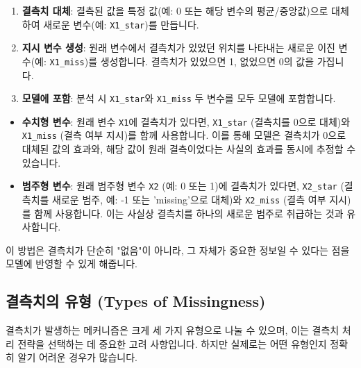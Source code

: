 \documentclass[11pt,a4paper]{book}
\theoremstyle{definition}
\begin{document}
\begin{infobox}[title=결측 지시 변수 생성 절차]
\begin{enumerate}
    \item \textbf{결측치 대체}: 결측된 값을 특정 값(예: 0 또는 해당 변수의 평균/중앙값)으로 대체하여 새로운 변수(예: \texttt{X1\_star})를 만듭니다.
    \item \textbf{지시 변수 생성}: 원래 변수에서 결측치가 있었던 위치를 나타내는 새로운 이진 변수(예: \texttt{X1\_miss})를 생성합니다. 결측치가 있었으면 1, 없었으면 0의 값을 가집니다.
    \item \textbf{모델에 포함}: 분석 시 \texttt{X1\_star}와 \texttt{X1\_miss} 두 변수를 모두 모델에 포함합니다.
\end{enumerate}
\end{infobox}

\begin{examplebox}[title=결측 지시 변수 활용 예시]
\begin{itemize}
    \item \textbf{수치형 변수}: 원래 변수 \texttt{X1}에 결측치가 있다면, \texttt{X1\_star} (결측치를 0으로 대체)와 \texttt{X1\_miss} (결측 여부 지시)를 함께 사용합니다. 이를 통해 모델은 결측치가 0으로 대체된 값의 효과와, 해당 값이 원래 결측이었다는 사실의 효과를 동시에 추정할 수 있습니다.
    \item \textbf{범주형 변수}: 원래 범주형 변수 \texttt{X2} (예: 0 또는 1)에 결측치가 있다면, \texttt{X2\_star} (결측치를 새로운 범주, 예: -1 또는 'missing'으로 대체)와 \texttt{X2\_miss} (결측 여부 지시)를 함께 사용합니다. 이는 사실상 결측치를 하나의 새로운 범주로 취급하는 것과 유사합니다.
\end{itemize}
이 방법은 결측치가 단순히 "없음"이 아니라, 그 자체가 중요한 정보일 수 있다는 점을 모델에 반영할 수 있게 해줍니다.
\end{examplebox}

\subsection*{결측치의 유형 (Types of Missingness)}
결측치가 발생하는 메커니즘은 크게 세 가지 유형으로 나눌 수 있으며, 이는 결측치 처리 전략을 선택하는 데 중요한 고려 사항입니다. 하지만 실제로는 어떤 유형인지 정확히 알기 어려운 경우가 많습니다.
\end{document}
